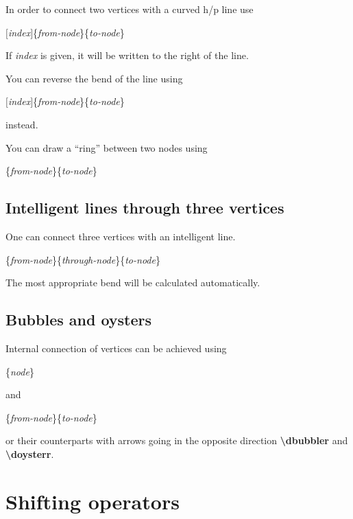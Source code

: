 \documentclass[a4paper]{article}
\newcommand{\myind}{\hspace{10pt}}
\begin{document}
In order to connect two vertices with a curved h/p line use

\myind{\bf \textbackslash dcurve}$[${\it index}$]$\{{\it from-node}\}\{{\it to-node}\}

If {\it index} is given, it will be written to the right of the line.

You can reverse the bend of the line using 

\myind{\bf \textbackslash dcurver}$[${\it index}$]$\{{\it from-node}\}\{{\it to-node}\}

instead.

You can draw a ``ring'' between two nodes using

\myind{\bf \textbackslash dcurcur}\{{\it from-node}\}\{{\it to-node}\}

\subsection{Intelligent lines through three vertices}

One can connect three vertices with an intelligent line. 

\myind{\bf \textbackslash dcurt}\{{\it from-node}\}\{{\it through-node}\}\{{\it to-node}\}

The most appropriate bend will be calculated automatically.

\subsection{Bubbles and oysters}
Internal connection of vertices can be achieved using  

\myind{\bf \textbackslash dbubble}\{{\it node}\}

and

\myind{\bf \textbackslash doyster}\{{\it from-node}\}\{{\it to-node}\}

or their counterparts with arrows going in the opposite direction {\bf \textbackslash dbubbler}
and {\bf \textbackslash doysterr}.

\section{Shifting operators}
\end{document}
